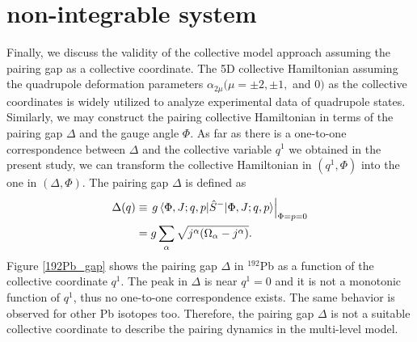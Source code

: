 \documentclass[11pt]{book} %
\begin{document}
\section{non-integrable system}
Finally, we discuss the validity of the collective model approach
assuming the pairing gap as a collective coordinate.
The 5D collective Hamiltonian assuming the quadrupole deformation
parameters $\alpha_{2\mu} (\mu=\pm2,\pm1,$ and $0)$ as the collective coordinates
is widely utilized to analyze experimental data of quadrupole states.
Similarly, we may construct the pairing collective Hamiltonian
in terms of the pairing gap $\Delta$ and the gauge angle $\Phi$. 
As far as there is a one-to-one correspondence between $\Delta$ 
and the collective variable $q^1$ we obtained in the present study,
we can transform the collective Hamiltonian in $(q^1,\Phi)$
into the one in $(\Delta,\Phi)$.
The pairing gap $\Delta$ is defined as
\begin{align}
  \Delta (q) &\equiv \left. g\braket{\Phi,J;q,p|\hat{S}^-|\Phi,J;q,p} \right|_{\Phi=p=0} \nonumber \\
  &= g\sum_\alpha \sqrt{j^\alpha(\Omega_\alpha-j^\alpha)} .
\end{align}
Figure \ref{192Pb_gap} shows the pairing gap $\Delta$ in ${}^{192}$Pb
as a function of the collective coordinate $q^1$.
The peak in $\Delta$ is near $q^1=0$ and it is not a monotonic
function of $q^1$, thus no one-to-one correspondence exists.
The same behavior is observed for other Pb isotopes too.
Therefore, the pairing gap $\Delta$ is not a suitable collective coordinate
to describe the pairing dynamics in the multi-level model.



\end{document}
